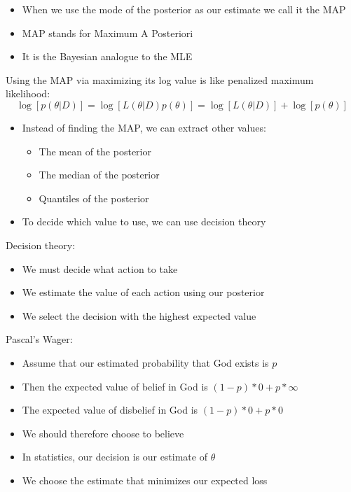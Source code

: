 \documentclass{beamer}
\begin{document}
\frame
{
  \begin{itemize}
    \item{When we use the mode of the posterior as our estimate we call it the MAP}
    \item{MAP stands for Maximum A Posteriori}
    \item{It is the Bayesian analogue to the MLE}
  \end{itemize}
}

\frame
{
Using the MAP via maximizing its log value is like penalized maximum likelihood:
\[
\log[p(\theta | D)] = \log[L(\theta | D) p(\theta)] = \log[L(\theta | D)] + \log[p(\theta)]
\]
}

\frame
{
\begin{itemize}
\item{Instead of finding the MAP, we can extract other values:}
\begin{itemize}
  \item{The mean of the posterior}
  \item{The median of the posterior}
  \item{Quantiles of the posterior}
\end{itemize}
\item{To decide which value to use, we can use decision theory}
\end{itemize}
}

\frame
{
  Decision theory:
  \begin{itemize}
    \item{We must decide what action to take}
    \item{We estimate the value of each action using our posterior}
    \item{We select the decision with the highest expected value}
  \end{itemize}
}

\frame
{
  Pascal's Wager:
  \begin{itemize}
    \item{Assume that our estimated probability that God exists is $p$}
    \item{Then the expected value of belief in God is $(1 - p) * 0 + p * \infty$}
    \item{The expected value of disbelief in God is $(1 - p) * 0 + p * 0$}
    \item{We should therefore choose to believe}
  \end{itemize}
}

\frame
{
  \begin{itemize}
    \item{In statistics, our decision is our estimate of $\theta$}
    \item{We choose the estimate that minimizes our expected loss}
  \end{itemize}
}
\end{document}
